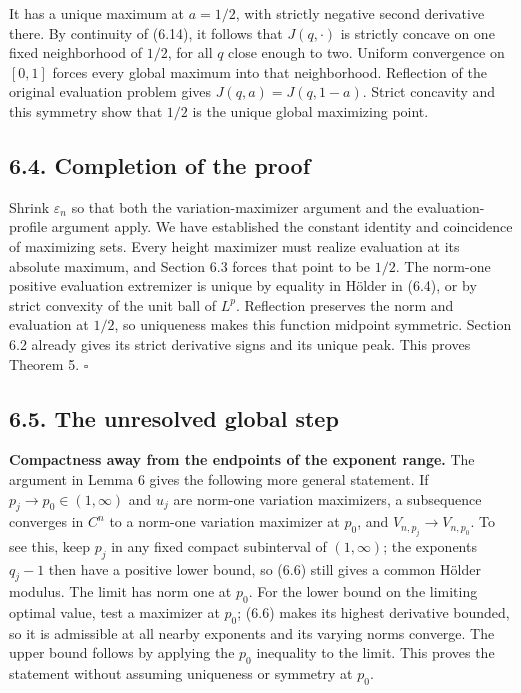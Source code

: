 \documentclass[11pt]{article}
\begin{document}
It has a unique maximum at \(a=1/2\), with strictly negative second
derivative there. By continuity of (6.14), it follows that
\(J(q,\cdot)\) is strictly concave on one fixed neighborhood of \(1/2\),
for all \(q\) close enough to two. Uniform convergence on \([0,1]\)
forces every global maximum into that neighborhood. Reflection of the
original evaluation problem gives \(J(q,a)=J(q,1-a)\). Strict concavity
and this symmetry show that \(1/2\) is the unique global maximizing
point.

\subsection{6.4. Completion of the proof}\label{completion-of-the-proof}

Shrink \(\varepsilon_n\) so that both the variation-maximizer argument
and the evaluation-profile argument apply. We have established the
constant identity and coincidence of maximizing sets. Every height
maximizer must realize evaluation at its absolute maximum, and Section
6.3 forces that point to be \(1/2\). The norm-one positive evaluation
extremizer is unique by equality in Hölder in (6.4), or by strict
convexity of the unit ball of \(L^p\). Reflection preserves the norm and
evaluation at \(1/2\), so uniqueness makes this function midpoint
symmetric. Section 6.2 already gives its strict derivative signs and its
unique peak. This proves Theorem 5. \(\square\)

\subsection{6.5. The unresolved global
step}\label{the-unresolved-global-step}

\textbf{Compactness away from the endpoints of the exponent range.} The
argument in Lemma 6 gives the following more general statement. If
\(p_j\to p_0\in(1,\infty)\) and \(u_j\) are norm-one variation
maximizers, a subsequence converges in \(C^n\) to a norm-one variation
maximizer at \(p_0\), and \(V_{n,p_j}\to V_{n,p_0}\). To see this, keep
\(p_j\) in any fixed compact subinterval of \((1,\infty)\); the
exponents \(q_j-1\) then have a positive lower bound, so (6.6) still
gives a common Hölder modulus. The limit has norm one at \(p_0\). For
the lower bound on the limiting optimal value, test a maximizer at
\(p_0\); (6.6) makes its highest derivative bounded, so it is admissible
at all nearby exponents and its varying norms converge. The upper bound
follows by applying the \(p_0\) inequality to the limit. This proves the
statement without assuming uniqueness or symmetry at \(p_0\).
\end{document}
